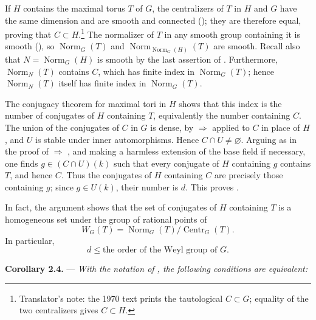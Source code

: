 If \(H\) contains the maximal torus \(T\) of \(G\), the centralizers
of \(T\) in \(H\) and \(G\) have the same dimension and are smooth
and connected (); they are therefore equal, proving that
\(C\subset H\).\footnote{Translator's note: the 1970 text prints the
tautological \(C\subset G\); equality of the two centralizers gives
\(C\subset H\).} The normalizer of \(T\) in any smooth group
containing it is smooth (), so
\(\operatorname{Norm}_G(T)\) and
\(\operatorname{Norm}_{\operatorname{Norm}_G(H)}(T)\) are smooth.
Recall also that \(N=\operatorname{Norm}_G(H)\) is smooth by the
last assertion of . Furthermore,
\(\operatorname{Norm}_N(T)\) contains \(C\), which has finite index
in \(\operatorname{Norm}_G(T)\); hence
\(\operatorname{Norm}_N(T)\) itself has finite index in
\(\operatorname{Norm}_G(T)\).

The conjugacy theorem for maximal tori in \(H\) shows that this index
is the number of conjugates of \(H\) containing \(T\), equivalently
the number containing \(C\). The union of the conjugates of \(C\) in
\(G\) is dense, by  \(\Rightarrow\)  applied to \(C\) in
place of \(H\), and \(U\) is stable under inner automorphisms. Hence
\(C\cap U\neq\varnothing\). Arguing as in the proof of
 \(\Rightarrow\) , and making a harmless extension of the
base field if necessary, one finds
\(g\in(C\cap U)(k)\) such that every conjugate of \(H\) containing
\(g\) contains \(T\), and hence \(C\). Thus the conjugates of \(H\)
containing \(C\) are precisely those containing \(g\); since
\(g\in U(k)\), their number is \(d\). This proves .

In fact, the argument shows that the set of conjugates of \(H\)
containing \(T\) is a homogeneous set under the group of rational
points of
\[
  W_G(T)=
  \operatorname{Norm}_G(T)/\operatorname{Centr}_G(T).
\]
In particular,
\[
  d\leq\text{the order of the Weyl group of \(G\)}.
\]

\medskip
\noindent{}\textbf{Corollary 2.4.} ---
\textit{With the notation of , the following conditions are
equivalent:}

